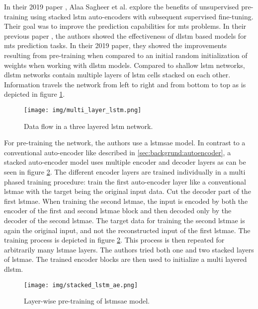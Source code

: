 In their 2019 paper \cite{unsupervised_learning_lstms_timeseries}, Alaa Sagheer et al. explore the benefits of unsupervised pre-training using stacked \gls{lstm} auto-encoders with subsequent supervised fine-tuning. Their goal was to improve the prediction capabilities for \gls{mts} problems. In their previous paper \cite{dlstm_time_series_forecasting}, the authors showed the effectiveness of \gls{dlstm} based models for \gls{mts} prediction tasks. In their 2019 paper, they showed the improvements resulting from pre-training when compared to an initial random initialization of weights when working with \gls{dlstm} models. Compared to shallow \gls{lstm} networks, \gls{dlstm} networks contain multiple layers of \gls{lstm} cells stacked on each other. Information travels the network from left to right and from bottom to top as is depicted in figure \ref{fig:stateofart:unsupervised_learning_with_lstms_dlstm}. 

\begin{figure}[]
	\centering
	\texttt{[image: img/multi\_layer\_lstm.png]}
	\caption{Data flow in a three layered \gls{lstm} network.}
	\label{fig:stateofart:unsupervised_learning_with_lstms_dlstm}
\end{figure}

For pre-training the network, the authors use a \gls{lstmsae} model. In contrast to a conventional auto-encoder like described in \ref{sec:backgrund:autoencoder}, a stacked auto-encoder model uses multiple encoder and decoder layers as can be seen in figure \ref{fig:stateofart:unsupervised_learning_dlstm_mts_lstmsae}. The different encoder layers are trained individually in a multi phased training procedure: train the first auto-encoder layer like a conventional \gls{lstmae} with the target being the original input data. Cut the decoder part of the first \gls{lstmae}. When training the second \gls{lstmae}, the input is encoded by both the encoder of the first and second \gls{lstmae} block and then decoded only by the decoder of the second \gls{lstmae}. The target data for training the second \gls{lstmae} is again the original input, and not the reconstructed input of the first \gls{lstmae}. The training process is depicted in figure \ref{fig:stateofart:unsupervised_learning_dlstm_mts_lstmsae}. This process is then repeated for arbitrarily many \gls{lstmae} layers. The authors tried both one and two stacked layers of \gls{lstmae}. The trained encoder blocks are then used to initialize a multi layered \gls{dlstm}.

\begin{figure}[]
	\centering
	\texttt{[image: img/stacked\_lstm\_ae.png]}
	\caption{Layer-wise pre-training of \gls{lstmsae} model. \cite{unsupervised_learning_lstms_timeseries}}
	\label{fig:stateofart:unsupervised_learning_dlstm_mts_lstmsae}
\end{figure}

